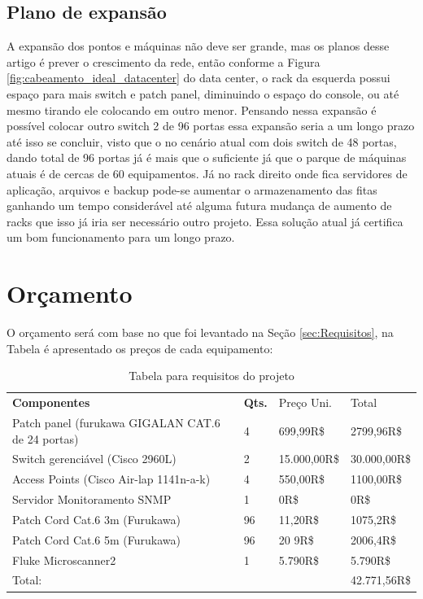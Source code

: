 \documentclass[	DIV=calc,%
							paper=a4,%
							fontsize=12pt,%
							onecolumn]{scrartcl}	 					%
\begin{document}
\subsection{Plano de expansão}
A expansão dos pontos e máquinas não deve ser grande, mas os planos desse artigo é prever o crescimento da rede, então conforme a Figura \ref{fig:cabeamento_ideal_datacenter} do data center, o rack da esquerda possui espaço para mais switch e patch panel, diminuindo o espaço do console, ou até mesmo tirando ele colocando em outro menor. Pensando nessa expansão é possível colocar outro switch 2 de 96 portas essa expansão seria a um longo prazo até isso se concluir, visto que o no cenário atual com dois switch de 48 portas, dando total de 96 portas já é mais que o suficiente já que o parque de máquinas atuais é de cercas de 60 equipamentos. Já no rack direito onde fica servidores de aplicação, arquivos e backup pode-se aumentar o armazenamento das fitas ganhando um tempo considerável até alguma futura mudança de aumento de racks que isso já iria ser necessário outro projeto. Essa solução atual já certifica um bom funcionamento para um longo prazo.

\section{Orçamento}
O orçamento será com base no que foi levantado na Seção \ref{sec:Requisitos}, na Tabela  é apresentado os preços de cada equipamento:
\begin{table}[!htbp]
	\centering
	\begin{tabular}{|l|l|l|l|}
		\cline{1-4}
		\textbf{Componentes}        & \textbf{Qts.} &  Preço Uni.          & Total \\
		\cline{1-4}
		Patch panel (furukawa GIGALAN CAT.6 de 24 portas) & 4  & 699,99R\$ 			      &  2799,96R\$ \\
		\cline{1-4}
		Switch gerenciável (Cisco 2960L)                  & 2  & 15.000,00R\$ 			  & 30.000,00R\$  \\
		\cline{1-4}
		Access Points 	   (Cisco Air-lap 1141n-a-k) 	  & 4  & 550,00R\$    			  & 1100,00R\$  \\
		\cline{1-4}
		Servidor Monitoramento SNMP 	 				  & 1  & 0R\$         			  & 0R\$  \\	
		\cline{1-4}
		Patch Cord Cat.6  3m (Furukawa)	   				  & 96 & 11,20R\$  		          & 1075,2R\$   \\
		\cline{1-4}
		Patch Cord Cat.6  5m (Furukawa)	   				  & 96 & 20 9R\$ 		  		  & 2006,4R\$  \\
		\cline{1-4}
		Fluke Microscanner2	   							  & 1  & 5.790R\$ 		  		  & 5.790R\$ \\
		\cline{1-4}
		Total: 											  &    &                          &  42.771,56R\$ \\
		\cline{1-4}
	\end{tabular}
	\caption{Tabela para requisitos do projeto}\label{tab:orcamento}
\end{table}
\end{document}
